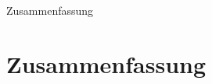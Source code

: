 \documentclass{standalone}
\begin{document}
\begin{frame}
  \begin{center}
    Zusammenfassung
  \end{center}
  \section{Zusammenfassung}
\end{frame}
\end{document}
